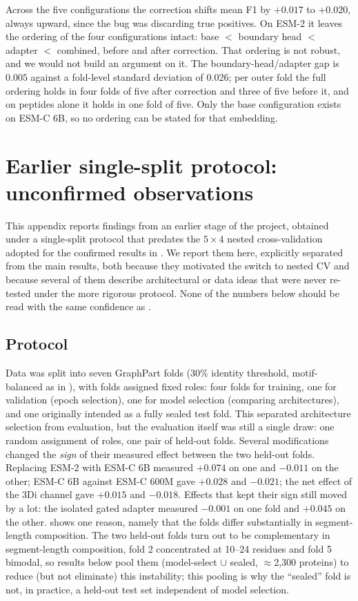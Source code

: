 \documentclass{article}
\begin{document}
Across the five configurations the correction shifts mean F1 by $+0.017$ to $+0.020$, always upward, since the bug was discarding true positives. On ESM-2 it leaves the ordering of the four configurations intact: base $<$ boundary head $<$ adapter $<$ combined, before and after correction. That ordering is not robust, and we would not build an argument on it. The boundary-head/adapter gap is $0.005$ against a fold-level standard deviation of $0.026$; per outer fold the full ordering holds in four folds of five after correction and three of five before it, and on peptides alone it holds in one fold of five. Only the base configuration exists on ESM-C 6B, so no ordering can be stated for that embedding.
\section{Earlier single-split protocol: unconfirmed observations}
\label{sec:app-old-protocol}

This appendix reports findings from an earlier stage of the project, obtained under a single-split protocol that predates the $5\times4$ nested cross-validation adopted for the confirmed results in . We report them here, explicitly separated from the main results, both because they motivated the switch to nested CV and because several of them describe architectural or data ideas that were never re-tested under the more rigorous protocol. None of the numbers below should be read with the same confidence as .

\subsection{Protocol}

Data was split into seven GraphPart folds (30\% identity threshold, motif-balanced as in ), with folds assigned fixed roles: four folds for training, one for validation (epoch selection), one for model selection (comparing architectures), and one originally intended as a fully sealed test fold. This separated architecture selection from evaluation, but the evaluation itself was still a single draw: one random assignment of roles, one pair of held-out folds. Several modifications changed the \emph{sign} of their measured effect between the two held-out folds. Replacing ESM-2 with ESM-C 6B measured $+0.074$ on one and $-0.011$ on the other; ESM-C 6B against ESM-C 600M gave $+0.028$ and $-0.021$; the net effect of the 3Di channel gave $+0.015$ and $-0.018$. Effects that kept their sign still moved by a lot: the isolated gated adapter measured $-0.001$ on one fold and $+0.045$ on the other.  shows one reason, namely that the folds differ substantially in segment-length composition. The two held-out folds turn out to be complementary in segment-length composition, fold 2 concentrated at 10--24 residues and fold 5 bimodal, so results below pool them (model-select $\cup$ sealed, $\approx$2{,}300 proteins) to reduce (but not eliminate) this instability; this pooling is why the ``sealed'' fold is not, in practice, a held-out test set independent of model selection.
\end{document}
